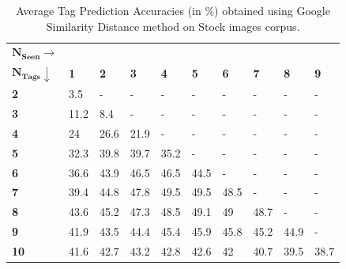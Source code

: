 \begin{table}[~htp]
\fontsize{8pt}{1em}\selectfont
\begin{center}
\caption{Average Tag Prediction Accuracies (in \%) obtained using Google Similarity Distance method on Stock images corpus.}
\label{tab:TPGWS30Google}
\begin{tabular}{|p{1.5cm}|p{0.5cm}|p{0.5cm}|p{0.5cm}|p{0.5cm}|p{0.5cm}|p{0.5cm}|p{0.5cm}|p{0.5cm}|p{0.5cm}|}
		\hline
		{$\boldsymbol{N_{Seen} \rightarrow}$} & &  &  &  & &  &  &  &\\ 
		{$\boldsymbol{N_{Tags}}\downarrow $} & \textbf{1} & \textbf{2} & \textbf{3} & \textbf{4} & \textbf{5}  & \textbf{6} & \textbf{7} & \textbf{8} & \textbf{9} \\ 
		\hline 		
		\textbf{2} & 3.5&-&-&-&-&-&-&-&- \\
		\hline
		\textbf{3} & 11.2&8.4&-&-&-&-&-&-&- \\
		\hline
		\textbf{4} & 24&26.6&21.9&-&-&-&-&-&- \\
		\hline
		\textbf{5} & 32.3&39.8&39.7&35.2&-&-&-&-&- \\
		\hline
		\textbf{6} & 36.6&43.9&46.5&46.5&44.5&-&-&-&- \\
		\hline
		\textbf{7} & 39.4&44.8&47.8&49.5&49.5&48.5&-&-&- \\
		\hline
		\textbf{8} & 43.6&45.2&47.3&48.5&49.1&49&48.7&-&- \\
		\hline
		\textbf{9} & 41.9&43.5&44.4&45.4&45.9&45.8&45.2&44.9&- \\
		\hline
		\textbf{10} & 41.6&42.7&43.2&42.8&42.6&42&40.7&39.5&38.7 \\
		\hline
\end{tabular}
\vspace{-2.5mm}
\end{center}
\end{table}
